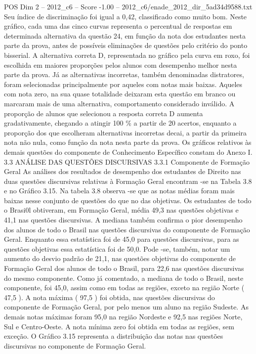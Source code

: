 \begin{textsample}{POS Dim 2 – 2012\_c6 – Score -1.00 – 2012\_c6/enade\_2012\_dir\_5ad34d9588.txt}
Seu índice de discriminação foi igual a 0,42, classificado como muito bom.
Neste gráfico, cada uma das cinco curvas representa o percentual de respostas em determinada alternativa da questão 24, em função da nota dos estudantes nesta parte da prova, antes de possíveis eliminações de questões pelo critério do ponto bisserial.
A alternativa correta D, representada no gráfico pela curva em roxo, foi escolhida em maiores proporções pelos alunos com desempenho melhor nesta parte da prova.
Já as alternativas incorretas, também denominadas distratores, foram selecionadas principalmente por aqueles com notas mais baixas.
Aqueles com nota zero, na sua quase totalidade deixaram esta questão em branco ou marcaram mais de uma alternativa, comportamento considerado inválido.
A proporção de alunos que selecionou a resposta correta D aumenta gradativamente, chegando a atingir 100 \% a partir de 20 acertos, enquanto a proporção dos que escolheram alternativas incorretas decai, a partir da primeira nota não nula, como função da nota nesta parte da prova.
Os gráficos relativos às demais questões do componente de Conhecimento Específico constam do Anexo I. 3.3 ANÁLISE DAS QUESTÕES DISCURSIVAS 3.3.1 Componente de Formação Geral As análises dos resultados de desempenho dos estudantes de Direito nas duas questões discursivas relativas à Formação Geral encontram -se na Tabela 3.8 e no Gráfico 3.15.
Na tabela 3.8 observa -se que as notas médias foram mais baixas nesse conjunto de questões do que no das objetivas.
Os estudantes de todo o Brasi0l obtiveram, em Formação Geral, média 49,3 nas questões objetivas e 41,1 nas questões discursivas.
A mediana também confirma o pior desempenho dos alunos de todo o Brasil nas questões discursivas do componente de Formação Geral.
Enquanto essa estatística foi de 45,0 para questões discursivas, para as questões objetivas essa estatística foi de 50,0.
Pode -se, também, notar um aumento do desvio padrão de 21,1, nas questões objetivas do componente de Formação Geral dos alunos de todo o Brasil, para 22,6 nas questões discursivas do mesmo componente.
Como já comentado, a mediana de todo o Brasil, neste componente, foi 45,0, assim como em todas as regiões, exceto na região Norte ( 47,5 ).
A nota máxima ( 97,5 ) foi obtida, nas questões discursivas do componente de Formação Geral, por pelo menos um aluno na região Sudeste.
As demais notas máximas foram 95,0 na região Nordeste e 92,5 nas regiões Norte, Sul e Centro-Oeste.
A nota mínima zero foi obtida em todas as regiões, sem exceção.
O Gráfico 3.15 representa a distribuição das notas nas questões discursivas no componente de Formação Geral.

\end{textsample}
